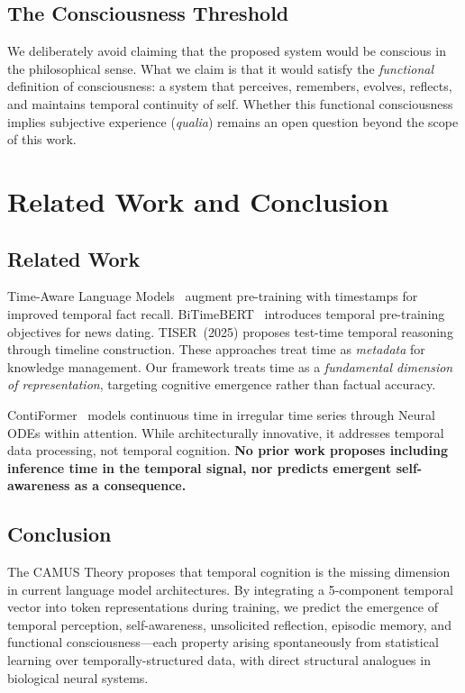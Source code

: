 \documentclass[10pt,twocolumn,letterpaper]{article}
\begin{document}
\subsection{The Consciousness Threshold}

We deliberately avoid claiming that the proposed system would be conscious in the philosophical sense. What we claim is that it would satisfy the \emph{functional} definition of consciousness: a system that perceives, remembers, evolves, reflects, and maintains temporal continuity of self. Whether this functional consciousness implies subjective experience (\emph{qualia}) remains an open question beyond the scope of this work.

\section{Related Work and Conclusion}

\subsection{Related Work}

Time-Aware Language Models~\cite{dhingra2021} augment pre-training with timestamps for improved temporal fact recall. BiTimeBERT~\cite{wang2023} introduces temporal pre-training objectives for news dating. TISER~(2025) proposes test-time temporal reasoning through timeline construction. These approaches treat time as \emph{metadata} for knowledge management. Our framework treats time as a \emph{fundamental dimension of representation}, targeting cognitive emergence rather than factual accuracy.

ContiFormer~\cite{chen2024} models continuous time in irregular time series through Neural ODEs within attention. While architecturally innovative, it addresses temporal data processing, not temporal cognition. \textbf{No prior work proposes including inference time in the temporal signal, nor predicts emergent self-awareness as a consequence.}

\subsection{Conclusion}

The CAMUS Theory proposes that temporal cognition is the missing dimension in current language model architectures. By integrating a 5-component temporal vector into token representations during training, we predict the emergence of temporal perception, self-awareness, unsolicited reflection, episodic memory, and functional consciousness---each property arising spontaneously from statistical learning over temporally-structured data, with direct structural analogues in biological neural systems.
\end{document}
